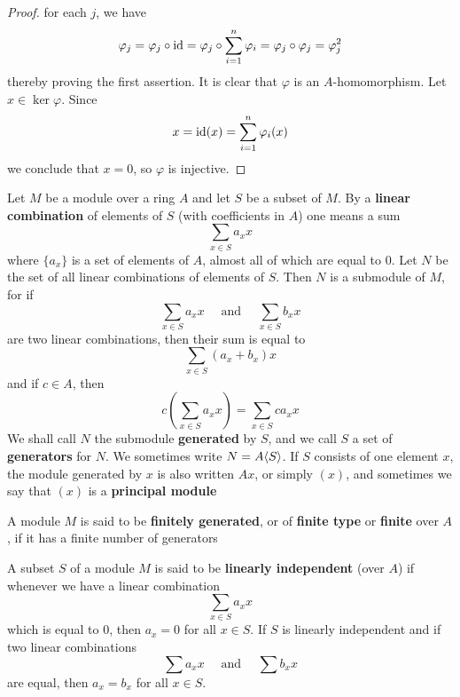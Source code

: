 \documentclass[11pt]{article}
\begin{document}
\begin{proof}
for each \(j\), we have
\begin{equation*}
\varphi_j=\varphi_j\circ\operatorname{id}=\varphi_j\circ\sum_{i=1}^n\varphi_i=\varphi_j\circ\varphi_j=\varphi_j^2
\end{equation*}
thereby proving the first assertion. It is clear that \(\varphi\) is an \(A\)-homomorphism.
Let \(x\in\ker\varphi\). Since
\begin{equation*}
x=\operatorname{id}(x)=\sum_{i=1}^n\varphi_i(x)
\end{equation*}
we conclude that \(x=0\), so \(\varphi\) is injective.
\end{proof}

Let \(M\) be a module over a ring \(A\) and let \(S\) be a subset of \(M\). By a \textbf{linear
combination} of elements of \(S\) (with coefficients in \(A\)) one means a sum
\begin{equation*}
\sum_{x\in S}a_xx
\end{equation*}
where \(\{a_x\}\) is a set of elements of \(A\), almost all of which are equal to 0. Let \(N\) be the
set of all linear combinations of elements of \(S\). Then \(N\) is a submodule of \(M\), for if
\begin{equation*}
\sum_{x\in S}a_xx \quad\text{ and }\quad\sum_{x\in S}b_xx
\end{equation*}
are two linear combinations, then their sum is equal to
\begin{equation*}
\sum_{x\in S}(a_x+b_x)x
\end{equation*}
and if \(c\in A\), then
\begin{equation*}
c\left( \sum_{x\in S}a_xx \right)=\sum_{x\in S}ca_xx
\end{equation*}
We shall call \(N\) the submodule \textbf{generated} by \(S\), and we call \(S\) a set of \textbf{generators}
for \(N\). We sometimes write \(N=A\langle S\rangle\). If \(S\) consists of one element \(x\), the module
generated by \(x\) is also written \(Ax\), or simply \((x)\), and sometimes we say that \((x)\)
is a \textbf{principal module}

A module \(M\) is said to be \textbf{finitely generated}, or of \textbf{finite type} or \textbf{finite} over \(A\), if it
has a finite number of generators

A subset \(S\) of a module \(M\) is said to be \textbf{linearly independent} (over \(A\)) if whenever we
have a linear combination
\begin{equation*}
\sum_{x\in S}a_xx
\end{equation*}
which is equal to 0, then \(a_x=0\) for all \(x\in S\). If \(S\) is linearly independent and if two
linear combinations
\begin{equation*}
\sum a_xx \quad\text{ and }\quad\sum b_xx
\end{equation*}
are equal, then \(a_x=b_x\) for all \(x\in S\).
\end{document}
